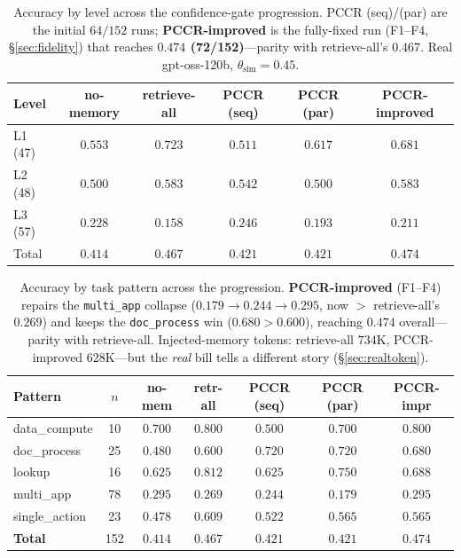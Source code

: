 \documentclass[10pt,twocolumn]{article}
\newcommand{\code}[1]{\texttt{\small #1}}
\begin{document}
\begin{table}[t]
\centering\small
\setlength{\tabcolsep}{5pt}
\begin{tabular}{@{}lccccc@{}}
\toprule
Level & no-memory & retrieve-all & PCCR (seq) & PCCR (par) & \textbf{PCCR-improved} \\
\midrule
L1 (47) & $0.553$ & $\mathbf{0.723}$ & $0.511$ & $0.617$ & $0.681$ \\
L2 (48) & $0.500$ & $0.583$ & $0.542$ & $0.500$ & $\mathbf{0.583}$ \\
L3 (57) & $0.228$ & $0.158$ & $0.246$ & $0.193$ & $0.211$ \\
\midrule
Total   & $0.414$ & $0.467$ & $0.421$ & $0.421$ & $\mathbf{0.474}$ \\
\bottomrule
\end{tabular}
\caption{Accuracy by level across the confidence-gate progression. PCCR (seq)/(par) are the initial
$64/152$ runs; \textbf{PCCR-improved} is the fully-fixed run (F1--F4, \S\ref{sec:fidelity}) that
reaches \textbf{$0.474$ (72/152)}---parity with retrieve-all's $0.467$. Real gpt-oss-120b,
$\theta_{\text{sim}}{=}0.45$.}
\label{tab:cg-level}
\end{table}

\begin{table}[t]
\centering\small
\setlength{\tabcolsep}{5pt}
\begin{tabular}{@{}lcccccc@{}}
\toprule
Pattern & $n$ & no-mem & retr-all & PCCR (seq) & PCCR (par) & \textbf{PCCR-impr} \\
\midrule
data\_compute  & 10 & $0.700$ & $\mathbf{0.800}$ & $0.500$ & $0.700$ & $\mathbf{0.800}$ \\
doc\_process   & 25 & $0.480$ & $0.600$ & $0.720$ & $0.720$ & $\mathbf{0.680}$ \\
lookup         & 16 & $0.625$ & $\mathbf{0.812}$ & $0.625$ & $0.750$ & $0.688$ \\
multi\_app     & 78 & $0.295$ & $0.269$ & $0.244$ & $0.179$ & $\mathbf{0.295}$ \\
single\_action & 23 & $0.478$ & $\mathbf{0.609}$ & $0.522$ & $0.565$ & $0.565$ \\
\midrule
\textbf{Total} & 152 & $0.414$ & $0.467$ & $0.421$ & $0.421$ & $\mathbf{0.474}$ \\
\bottomrule
\end{tabular}
\caption{Accuracy by task pattern across the progression. \textbf{PCCR-improved} (F1--F4) repairs the
\code{multi\_app} collapse ($0.179{\to}0.244{\to}\mathbf{0.295}$, now $>$ retrieve-all's $0.269$) and
keeps the \code{doc\_process} win ($0.680>0.600$), reaching $0.474$ overall---parity with
retrieve-all. Injected-memory tokens: retrieve-all $734$K, PCCR-improved $628$K---but the
\emph{real} bill tells a different story (\S\ref{sec:realtoken}).}
\label{tab:cg-pat}
\end{table}
\end{document}
